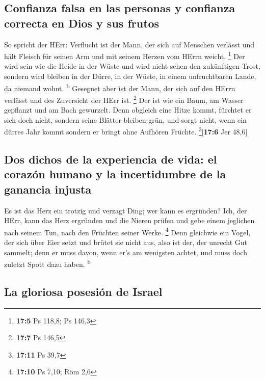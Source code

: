 \hypertarget{confianza-falsa-en-las-personas-y-confianza-correcta-en-dios-y-sus-frutos}{%
\subsection{Confianza falsa en las personas y confianza correcta en Dios
y sus
frutos}\label{confianza-falsa-en-las-personas-y-confianza-correcta-en-dios-y-sus-frutos}}

 So spricht der HErr: Verflucht ist der Mann, der sich auf
Menschen verlässt und hält Fleisch für seinen Arm und mit seinem Herzen
vom HErrn weicht. \footnote{\textbf{17:5} Ps 118,8; Ps 146,3}
 Der wird sein wie die Heide in der Wüste und wird nicht
sehen den zukünftigen Trost, sondern wird bleiben in der Dürre, in der
Wüste, in einem unfruchtbaren Lande, da niemand wohnt.
\textsuperscript{b}  Gesegnet aber ist der Mann, der sich
auf den HErrn verlässt und des Zuversicht der HErr ist. \footnote{\textbf{17:7}
  Ps 146,5}  Der ist wie ein Baum, am Wasser gepflanzt und
am Bach gewurzelt. Denn obgleich eine Hitze kommt, fürchtet er sich doch
nicht, sondern seine Blätter bleiben grün, und sorgt nicht, wenn ein
dürres Jahr kommt sondern er bringt ohne Aufhören Früchte.
\footnote{\textbf{17:11} Ps 39,7}{[}\textbf{17:6} Jer 48,6{]}

\hypertarget{dos-dichos-de-la-experiencia-de-vida-el-corazuxf3n-humano-y-la-incertidumbre-de-la-ganancia-injusta}{%
\subsection{Dos dichos de la experiencia de vida: el corazón humano y la
incertidumbre de la ganancia
injusta}\label{dos-dichos-de-la-experiencia-de-vida-el-corazuxf3n-humano-y-la-incertidumbre-de-la-ganancia-injusta}}

 Es ist das Herz ein trotzig und verzagt Ding; wer kann es
ergründen?  Ich, der HErr, kann das Herz ergründen und
die Nieren prüfen und gebe einem jeglichen nach seinem Tun, nach den
Früchten seiner Werke. \footnote{\textbf{17:10} Ps 7,10; Röm 2,6}
 Denn gleichwie ein Vogel, der sich über Eier setzt und
brütet sie nicht aus, also ist der, der unrecht Gut sammelt; denn er
muss davon, wenn er's am wenigsten achtet, und muss doch zuletzt Spott
dazu haben. \textsuperscript{b}

\hypertarget{la-gloriosa-posesiuxf3n-de-israel}{%
\subsection{La gloriosa posesión de
Israel}\label{la-gloriosa-posesiuxf3n-de-israel}}

